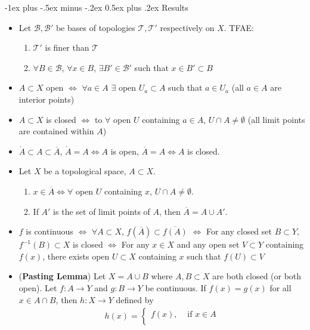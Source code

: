 \documentclass[frenchspacing,9pt,landscape,a4paper]{article}
\makeatletter
\renewcommand{\section}{\@startsection{section}{1}{0mm}%
                                {-1ex plus -.5ex minus -.2ex}%
                                {0.5ex plus .2ex}%
                                {\normalfont\large\bfseries}}
\theoremstyle{remark}
\makeatother
\begin{document}
\begin{multicols}{4}
\section{Results}
\begin{itemize}
    \item Let $\mathcal{B},\mathcal{B}'$ be bases of topologies  $\mathcal{T},\mathcal{T}'$ respectively on  $X$.
    TFAE:
     \begin{enumerate}
         \item $\mathcal{T}'$ is finer than  $\mathcal{T}$
         \item  $\forall B\in\mathcal{B}$,  $\forall x\in B$,  $\exists B'\in\mathcal{B}'$ such that  $x\in
             B'\subset B$
    \end{enumerate}
 \item $A\subset X$ open  $\iff$  $\forall a\in A$ $\exists$ open  $U_a\subset A$ such that  $a\in U_a$
     (all $a\in A$ are interior points)
 \item $A\subset X$ is closed $\iff$ to $\forall$ open  $U$
     containing  $a\in A$,  $U\cap A\neq\emptyset$ (all limit points are contained within $A$)         
 \item $\mathring{A}\subset A\subset\overline{A}$, $\mathring{A}=A\iff A$ is open, $\overline{A}=A\iff A$ is closed.
 \item Let $X$ be a topological space,  $A\subset X$.
     \begin{enumerate}
         \item $x\in\overline{A}\iff\forall$ open  $U$ containing  $x$,  $U\cap A\neq\emptyset$.
         \item If  $A'$ is the set of limit points of  $A$, then  $\overline{A}=A\cup A'$.
    \end{enumerate}
\item $f$ is continuous $\iff$ $\forall A\subset X$,  $f(\overline{A})\subset\overline{f(A)}$
             $\iff$ For any closed set  $B\subset Y$,  $f^{-1}(B)\subset X$ is closed $\iff$ For any  $x\in X$ and any open set  $V\subset Y$ containing  $f(x)$, there exists open $U\subset X$ containing  $x$ such that  $f(U)\subset V$ 
         \item (\textbf{Pasting Lemma}) Let $X=A\cup B$ where  $A,B\subset X$ are both closed (or both open). Let  $f:A\to Y$ and  $g:B\to Y$
    be continuous. If  $f(x)=g(x)$ for all  $x\in A\cap B$, then  $h:X\to Y$ defined by
    \begin{align*}
        h(x)=\begin{cases}
            f(x), & \text{ if } x\in A\\

\end{cases}
\end{align*}
\end{itemize}
\end{multicols}
\end{document}
